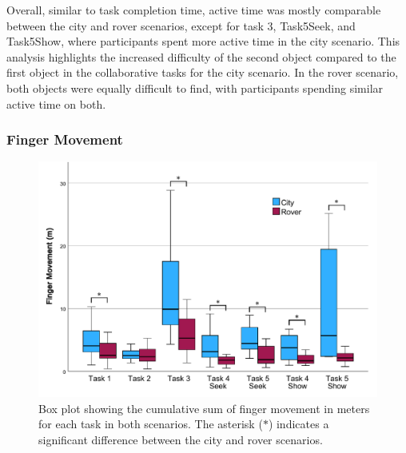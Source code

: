             Overall, similar to task completion time, active time was mostly comparable between the city and rover scenarios, except for task 3, Task5Seek, and Task5Show, where participants spent more active time in the city scenario. This analysis highlights the increased difficulty of the second object compared to the first object in the collaborative tasks for the city scenario. In the rover scenario, both objects were equally difficult to find, with participants spending similar active time on both.

        \subsubsection{Finger Movement}


            \begin{figure}[h!]
                \centering
                \includegraphics[width=1\linewidth]{figures/finger_movement_graph.pdf}
                \caption{Box plot showing the cumulative sum of finger movement in meters for each task in both scenarios. The asterisk ($\ast$) indicates a significant difference between the city and rover scenarios.}
                \label{fig:finger_movement}
            \end{figure}

